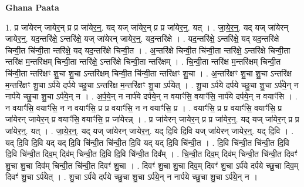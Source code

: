 \documentclass[17pt]{extarticle}
\begin{document}
\textbf{Ghana Paata } \newline

1. प्र जा॑येरन् जायेर॒न् प्र प्र जा॑येर॒न्॒. यद् यज् जा॑येर॒न् प्र प्र जा॑येर॒न्॒. यत् । . जा॒ये॒र॒न्॒. यद् यज् जा॑येरन् जायेर॒न्॒. यद॒न्तरि॑क्षे॒ ऽन्तरि॑क्षे॒ यज् जा॑येरन् जायेर॒न्॒. यद॒न्तरि॑क्षे । . यद॒न्तरि॑क्षे॒ ऽन्तरि॑क्षे॒ यद् यद॒न्तरि॑क्षे चिन्वी॒त चि॑न्वी॒ता न्तरि॑क्षे॒ यद् यद॒न्तरि॑क्षे चिन्वी॒त । . अ॒न्तरि॑क्षे चिन्वी॒त चि॑न्वी॒ता न्तरि॑क्षे॒ ऽन्तरि॑क्षे चिन्वी॒ता न्तरि॑क्ष म॒न्तरि॑क्षम् चिन्वी॒ता न्तरि॑क्षे॒ ऽन्तरि॑क्षे चिन्वी॒ता न्तरि॑क्षम् । . चि॒न्वी॒ता न्तरि॑क्ष म॒न्तरि॑क्षम् चिन्वी॒त चि॑न्वी॒ता न्तरि॑क्षꣳ शु॒चा शु॒चा ऽन्तरि॑क्षम् चिन्वी॒त चि॑न्वी॒ता न्तरि॑क्षꣳ शु॒चा । . अ॒न्तरि॑क्षꣳ शु॒चा शु॒चा ऽन्तरि॑क्ष म॒न्तरि॑क्षꣳ शु॒चा ऽर्प॑ये दर्पये च्छु॒चा ऽन्तरि॑क्ष म॒न्तरि॑क्षꣳ शु॒चा ऽर्प॑येत् । . शु॒चा ऽर्प॑ये दर्पये च्छु॒चा शु॒चा ऽर्प॑ये॒न् न नार्प॑ये च्छु॒चा शु॒चा ऽर्प॑ये॒न् न । . अ॒र्प॒ये॒न् न नार्प॑ये दर्पये॒न् न वयाꣳ॑सि॒ वयाꣳ॑सि॒ नार्प॑ये दर्पये॒न् न वयाꣳ॑सि । . न वयाꣳ॑सि॒ वयाꣳ॑सि॒ न न वयाꣳ॑सि॒ प्र प्र वयाꣳ॑सि॒ न न वयाꣳ॑सि॒ प्र । . वयाꣳ॑सि॒ प्र प्र वयाꣳ॑सि॒ वयाꣳ॑सि॒ प्र जा॑येरन् जायेर॒न् प्र वयाꣳ॑सि॒ वयाꣳ॑सि॒ प्र जा॑येरन्न् । . प्र जा॑येरन् जायेर॒न् प्र प्र जा॑येर॒न्॒. यद् यज् जा॑येर॒न् प्र प्र जा॑येर॒न्॒. यत् । . जा॒ये॒र॒न्॒. यद् यज् जा॑येरन् जायेर॒न्॒. यद् दि॒वि दि॒वि यज् जा॑येरन् जायेर॒न्॒. यद् दि॒वि । . यद् दि॒वि दि॒वि यद् यद् दि॒वि चि॑न्वी॒त चि॑न्वी॒त दि॒वि यद् यद् दि॒वि चि॑न्वी॒त । . दि॒वि चि॑न्वी॒त चि॑न्वी॒त दि॒वि दि॒वि चि॑न्वी॒त दिव॒म् दिव॑म् चिन्वी॒त दि॒वि दि॒वि चि॑न्वी॒त दिव᳚म् । . चि॒न्वी॒त दिव॒म् दिव॑म् चिन्वी॒त चि॑न्वी॒त दिवꣳ॑ शु॒चा शु॒चा दिव॑म् चिन्वी॒त चि॑न्वी॒त दिवꣳ॑ शु॒चा । . दिवꣳ॑ शु॒चा शु॒चा दिव॒म् दिवꣳ॑ शु॒चा ऽर्प॑ये दर्पये च्छु॒चा दिव॒म् दिवꣳ॑ शु॒चा ऽर्प॑येत् । . शु॒चा ऽर्प॑ये दर्पये च्छु॒चा शु॒चा ऽर्प॑ये॒न् न नार्प॑ये च्छु॒चा शु॒चा ऽर्प॑ये॒न् न । \newline
\end{document}
